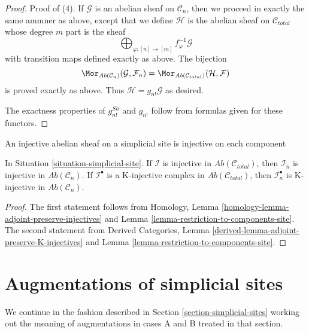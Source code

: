 \begin{proof}
\medskip\noindent
Proof of (4). If $\mathcal{G}$ is an abelian sheaf on $\mathcal{C}_n$,
then we proceed in exactly the same ammner as above, except that
we define $\mathcal{H}$ is the abelian sheaf on $\mathcal{C}_{total}$
whose degree $m$ part is the sheaf
$$
\bigoplus\nolimits_{\varphi : [n] \to [m]} f_\varphi^{-1}\mathcal{G}
$$
with transition maps defined exactly as above. The bijection
$$
\Mor_{\textit{Ab}(\mathcal{C}_n)}(\mathcal{G}, \mathcal{F}_n) =
\Mor_{\textit{Ab}(\mathcal{C}_{total})}(\mathcal{H}, \mathcal{F})
$$
is proved exactly as above.
Thus $\mathcal{H} = g_{n!}\mathcal{G}$ as desired.

\medskip\noindent
The exactness properties of $g^{Sh}_{n!}$ and $g_{n!}$ follow
from formulas given for these functors.
\end{proof}

\begin{lemma}
\label{lemma-restriction-injective-to-component-site}
\begin{slogan}
An injective abelian sheaf on a simplicial site is injective on each component
\end{slogan}
In Situation \ref{situation-simplicial-site}.
If $\mathcal{I}$ is injective in $\textit{Ab}(\mathcal{C}_{total})$,
then $\mathcal{I}_n$ is injective in $\textit{Ab}(\mathcal{C}_n)$.
If $\mathcal{I}^\bullet$ is a K-injective complex in
$\textit{Ab}(\mathcal{C}_{total})$,
then $\mathcal{I}_n^\bullet$ is K-injective in $\textit{Ab}(\mathcal{C}_n)$.
\end{lemma}

\begin{proof}
The first statement follows from
Homology, Lemma \ref{homology-lemma-adjoint-preserve-injectives}
and
Lemma \ref{lemma-restriction-to-components-site}.
The second statement from
Derived Categories, Lemma \ref{derived-lemma-adjoint-preserve-K-injectives}
and
Lemma \ref{lemma-restriction-to-components-site}.
\end{proof}







\section{Augmentations of simplicial sites}
\label{section-augmentation-simplicial-sites}

\noindent
We continue in the fashion described in
Section \ref{section-simplicial-sites}
working out the meaning of augmentations in cases A and B
treated in that section.

